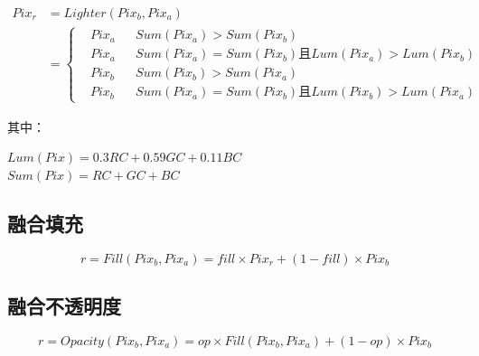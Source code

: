 	\begin{equation}
		\begin{aligned}
			Pix_r &=Lighter(Pix_b,Pix_a)\\&=\left\{\begin{aligned}&Pix_a && Sum(Pix_a)>Sum(Pix_b)\\&Pix_a&&  Sum(Pix_a)=Sum(Pix_b)\text{且}Lum(Pix_a)>Lum(Pix_b)\\&Pix_b&&  Sum(Pix_b)>Sum(Pix_a)\\&Pix_b&&  Sum(Pix_a)=Sum(Pix_b)\text{且}Lum(Pix_b)>Lum(Pix_a)\end{aligned}\right.
		\end{aligned}
	\end{equation}
	\begin{notice}
		\item 其中：\begin{flushleft}
			$Lum(Pix) = 0.3RC+0.59GC+0.11BC$\\
			$Sum(Pix) = RC+GC+BC$
		\end{flushleft}
		
	\end{notice}
	

\subsection{ 融合填充}


\begin{equation}
	r=Fill(Pix_b,Pix_a) =fill\times Pix_r+(1-fill)\times Pix_b
	\end{equation}

\subsection{ 融合不透明度}


\begin{equation}
	r=Opacity(Pix_b,Pix_a)=op\times Fill(Pix_b,Pix_a)+(1-op)\times Pix_b
\end{equation}

